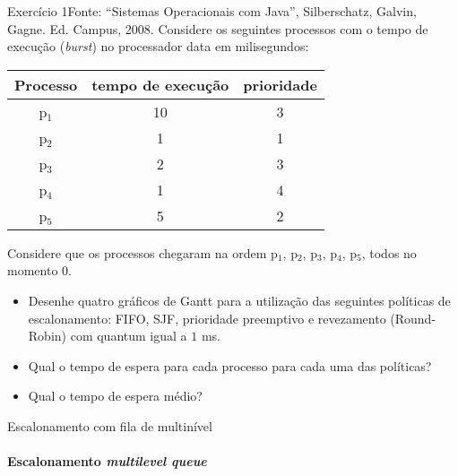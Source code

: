 \begin{frame}{Exercício 1}{Fonte: ``Sistemas Operacionais com Java'',
      Silberschatz, Galvin, Gagne. Ed. Campus, 2008.}
  \footnotesize
  Considere os seguintes processos com o tempo de execução ({\em burst}) no
  processador data em milisegundos:
  \begin{center}
  \begin{tabular}{ccc}\hline
    Processo & tempo de execução & prioridade \\\hline
    p$_1$ & 10 & 3\\
    p$_2$ & 1 & 1 \\
    p$_3$ & 2 & 3 \\
    p$_4$ & 1 & 4 \\
    p$_5$ & 5 & 2 \\\hline
  \end{tabular}
\end{center}
Considere que os processos chegaram na ordem p$_1$, p$_2$, p$_3$,
p$_4$, p$_5$, todos no momento $0$.
\begin{itemize}
\item Desenhe quatro gráficos de Gantt para a utilização das seguintes
  políticas de escalonamento: FIFO, SJF, prioridade preemptivo e
  revezamento (Round-Robin) com quantum igual a $1$ ms.
\item Qual o tempo de espera para cada processo para cada uma das políticas?
\item Qual o tempo de espera médio?
\end{itemize}

\end{frame}



\begin{frame}{Escalonamento com fila de multinível}
\framesubtitle{Escalonamento {\em multilevel queue}}

  
\end{frame}

